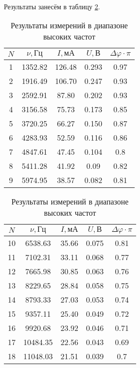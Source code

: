 \documentclass[a4paper,12pt]{article} %
\begin{document}
\begin{enumerate}
    Результаты занесём в таблицу \ref{tab3}.

    \begin{table}[h]
        \centering
        \begin{tabular}{|c|c|c|c|c|}
			\hline
                $N$ & $\nu, \text{Гц}$ &  $I, \text{мА}$ & $U, \text{В}$ & $\Delta \varphi \cdot \pi$ \\ \hline
                1 & 1352.82 & 126.48 & 0.293 & 0.97 \\ \hline
                2 & 1916.49 & 106.70 & 0.247 & 0.93 \\ \hline
                3 & 2592.91 & 87.80 & 0.202 & 0.93 \\ \hline
                4 & 3156.58 & 75.73 & 0.173 & 0.85 \\ \hline
                5 & 3720.25 & 66.27 & 0.150 & 0.87 \\ \hline
                6 & 4283.93 & 52.59 & 0.116 & 0.86 \\ \hline
                7 & 4847.61 & 47.45 & 0.104 & 0.8 \\ \hline
                8 & 5411.28 & 41.92 & 0.09 & 0.82 \\ \hline
                9 & 5974.95 & 38.57 & 0.082 & 0.81 \\ \hline
		\end{tabular}
            \hspace{.02\textwidth}
            \begin{tabular}{|c|c|c|c|c|}
			\hline
                $N$ & $\nu, \text{Гц}$ &  $I, \text{мА}$ & $U, \text{В}$ & $\Delta \varphi \cdot \pi$ \\ \hline
                10 & 6538.63 & 35.66 & 0.075 & 0.81 \\ \hline
                11 & 7102.31 & 33.11 & 0.068 & 0.77 \\ \hline
                12 & 7665.98 & 30.85 & 0.063 & 0.76 \\ \hline
                13 & 8229.65 & 28.84 & 0.058 & 0.75 \\ \hline
                14 & 8793.33 & 27.03 & 0.053 & 0.74 \\ \hline
                15 & 9357.11 & 25.40 & 0.049 & 0.72 \\ \hline
                16 & 9920.68 & 23.92 & 0.046 & 0.71 \\ \hline
                17 & 10484.35 & 22.56 & 0.043 & 0.69 \\ \hline
                18 & 11048.03 & 21.51 & 0.039 & 0.7 \\ \hline
		\end{tabular}
        \caption{Результаты измерений в диапазоне высоких частот}
        \label{tab3}
    \end{table}


\end{enumerate}
\end{document}
